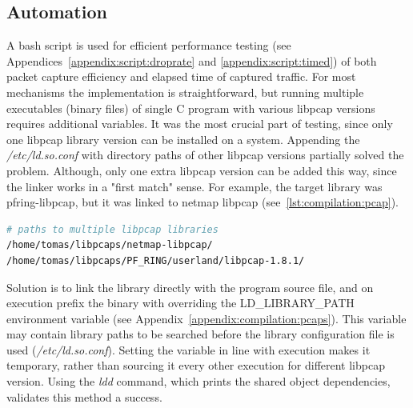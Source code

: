 \documentclass[12pt,a4paper,twoside]{report}
\begin{document}
		\subsection{Automation} \label{analysis:testing:auto}
			A bash script is used for efficient performance testing (see Appendices~\ref{appendix:script:droprate} and \ref{appendix:script:timed}) of both packet capture efficiency and elapsed time of captured traffic. For most mechanisms the implementation is straightforward, but running multiple executables (binary files) of single C program with various libpcap versions requires additional variables. It was the most crucial part of testing, since only one libpcap library version can be installed on a system. Appending the \emph{/etc/ld.so.conf} with directory paths of other libpcap versions partially solved the problem. Although, only one extra libpcap version can be added this way, since the linker works in a "first match" sense. For example, the target library was pfring-libpcap, but it was linked to netmap libpcap (see~\autoref{lst:compilation:pcap}).
			\begin{lstlisting}[language=bash, caption=Contents of /etc/ld.so.conf.d/libpcaps.conf., label=lst:compilation:pcap]
# paths to multiple libpcap libraries
/home/tomas/libpcaps/netmap-libpcap/
/home/tomas/libpcaps/PF_RING/userland/libpcap-1.8.1/
			\end{lstlisting}
			\par
			Solution is to link the library directly with the program source file, and on execution prefix the binary with overriding the LD\_LIBRARY\_PATH \cite{web:libraries:ldpath} environment variable (see Appendix~\ref{appendix:compilation:pcaps}). This variable may contain library paths to be searched before the library configuration file is used (\emph{/etc/ld.so.conf}). Setting the variable in line with execution makes it temporary, rather than sourcing it every other execution for different libpcap version. Using the \emph{ldd} command, which prints the shared object dependencies, validates this method a success.
\end{document}
